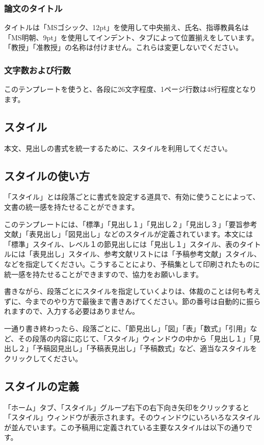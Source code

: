 \documentclass[9pt,twocolumn]{jarticle}
\begin{document}
\subsubsection{論文のタイトル}
タイトルは「MSゴシック、12pt」を使用して中央揃え、氏名、指導教員名は「MS明朝、9pt」を使用してインデント、タブによって位置揃えをしています。「教授」「准教授」の名称は付けません。これらは変更しないでください。
\subsubsection{文字数および行数}
このテンプレートを使うと、各段に26文字程度、1ページ行数は48行程度となります。
\subsection{スタイル}
本文、見出しの書式を統一するために、スタイルを利用してください。
\subsection{スタイルの使い方}
「スタイル」とは段落ごとに書式を設定する道具で、有効に使うことによって、文書の統一感を持たせることができます。

このテンプレートには、「標準」「見出し１」「見出し２」「見出し３」「要旨参考文献」「表見出し」「図見出し」などのスタイルが定義されています。本文には「標準」スタイル、レベル１の節見出しには「見出し１」スタイル、表のタイトルには「表見出し」スタイル、参考文献リストには「予稿参考文献」スタイル、などを指定してください。こうすることにより、予稿集として印刷されたものに統一感を持たせることができますので、協力をお願いします。

書きながら、段落ごとにスタイルを指定していくよりは、体裁のことは何も考えずに、今までのやり方で最後まで書きあげてください。節の番号は自動的に振られますので、入力する必要はありません。

一通り書き終わったら、段落ごとに、「節見出し」「図」「表」「数式」「引用」など、その段落の内容に応じて、「スタイル」ウィンドウの中から「見出し１」「見出し２」「予稿図見出し」「予稿表見出し」「予稿数式」など、適当なスタイルをクリックしてください。
\subsection{スタイルの定義}
「ホーム」タブ、「スタイル」グループ右下の右下向き矢印をクリックすると「スタイル」ウィンドウが表示されます。そのウィンドウにいろいろなスタイルが並んでいます。この予稿用に定義されている主要なスタイルは以下の通りです。
\end{document}

